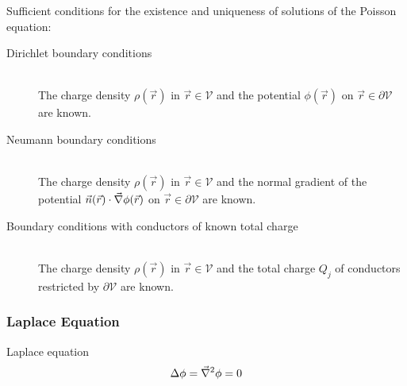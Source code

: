			\noindent
			Sufficient conditions for the existence and uniqueness of solutions of the Poisson equation:
			\begin{description}
				\item[Dirichlet boundary conditions]\hfill \\
					The charge density $\rho(\vec{r})$ in $\vec{r}\in\mathcal{V}$ and the potential $\phi(\vec{r})$ on $\vec{r}\in\partial\mathcal{V}$ are known.
				\item[Neumann boundary conditions]\hfill \\
					The charge density  $\rho(\vec{r})$ in $\vec{r}\in\mathcal{V}$ and the normal gradient of the potential  $\vec{n}(\vec{r})\cdot\vec{\nabla}\phi(\vec{r})$ on $\vec{r}\in\partial\mathcal{V}$ are known.
				\item[Boundary conditions with conductors of known total charge]\hfill \\
					The charge density $\rho(\vec{r})$ in $\vec{r}\in\mathcal{V}$ and the total charge $Q_j$ of conductors restricted by $\partial\mathcal{V}$ are known.
			\end{description}

		\subsubsection{Laplace Equation}
			\noindent
			Laplace equation
			\begin{equation}
				\Delta\phi=\vec{\nabla}^2\phi = 0
			\end{equation}

